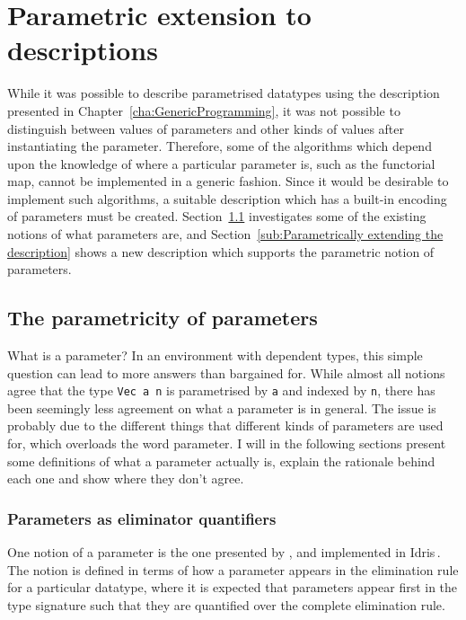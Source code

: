 \documentclass{ituthesis}
\newcommand{\tttype}[1]{\textcolor{type-color}{\texttt{#1}}}
\newcommand{\ttvar}[1]{\textcolor{local-var-color}{\texttt{#1}}}
\theoremstyle{break}
\begin{document}
\section{Parametric extension to descriptions}
\label{sec:Parametricextensiontodescriptions}

While it was possible to describe parametrised datatypes using the description presented in Chapter~\ref{cha:GenericProgramming}, it was not possible to distinguish
between values of parameters and other kinds of values after instantiating the parameter.
Therefore, some of the algorithms which depend upon the knowledge of where a particular parameter is, such as the functorial map,
cannot be implemented in a generic fashion.
Since it would be desirable to implement such algorithms, a suitable description which has a built-in encoding of parameters must be created.
Section~\ref{sub:The parametricity of parameters} investigates some of the existing notions of what parameters are, and Section~\ref{sub:Parametrically extending the description} shows a new description which supports
the parametric notion of parameters.

\subsection{The parametricity of parameters}
\label{sub:The parametricity of parameters}
What is a parameter?
In an environment with dependent types, this simple question can lead to more answers than bargained for.
While almost all notions agree that the type \tttype{Vec}~\ttvar{a}~\ttvar{n} is parametrised by \ttvar{a} and indexed by \ttvar{n}, there has been seemingly less agreement on what a parameter is in general.
The issue is probably due to the different things that different kinds of parameters are used for, which overloads the word parameter.
I will in the following sections present some definitions of what a parameter actually is, explain the rationale behind each one and show where they don't agree.

\subsubsection{Parameters as eliminator quantifiers}
\label{ssub:Parameters as eliminator quantifiers}
One notion of a parameter is the one presented by \textcite{Dybjer97inductivefamilies}, and implemented in Idris\,\autocite{brady2013idris}.
The notion is defined in terms of how a parameter appears in the elimination rule for a particular datatype, where it is expected that parameters appear first in the type signature such that they are quantified over the complete elimination rule.
\end{document}
